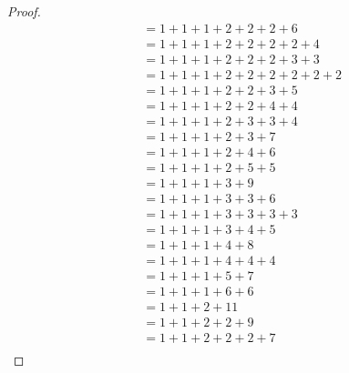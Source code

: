 \begin{proof}
\begin{align*}
           & = 1 + 1 + 1 + 2 + 2 + 2 + 6                                           \\
           & = 1 + 1 + 1 + 2 + 2 + 2 + 2 + 4                                       \\
           & = 1 + 1 + 1 + 2 + 2 + 2 + 3 + 3                                       \\
           & = 1 + 1 + 1 + 2 + 2 + 2 + 2 + 2 + 2                                   \\
           & = 1 + 1 + 1 + 2 + 2 + 3 + 5                                           \\
           & = 1 + 1 + 1 + 2 + 2 + 4 + 4                                           \\
           & = 1 + 1 + 1 + 2 + 3 + 3 + 4                                           \\
           & = 1 + 1 + 1 + 2 + 3 + 7                                               \\
           & = 1 + 1 + 1 + 2 + 4 + 6                                               \\
           & = 1 + 1 + 1 + 2 + 5 + 5                                               \\
           & = 1 + 1 + 1 + 3 + 9                                                   \\
           & = 1 + 1 + 1 + 3 + 3 + 6                                               \\
           & = 1 + 1 + 1 + 3 + 3 + 3 + 3                                           \\
           & = 1 + 1 + 1 + 3 + 4 + 5                                               \\
           & = 1 + 1 + 1 + 4 + 8                                                   \\
           & = 1 + 1 + 1 + 4 + 4 + 4                                               \\
           & = 1 + 1 + 1 + 5 + 7                                                   \\
           & = 1 + 1 + 1 + 6 + 6                                                   \\
           & = 1 + 1 + 2 + 11                                                      \\
           & = 1 + 1 + 2 + 2 + 9                                                   \\
           & = 1 + 1 + 2 + 2 + 2 + 7                                               \\

\end{align*}
\end{proof}
